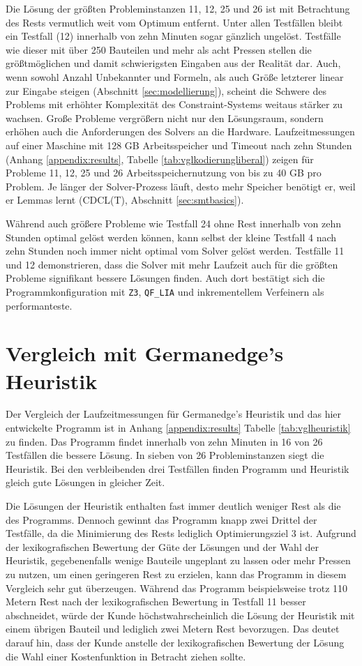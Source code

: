 Die Lösung der größten Probleminstanzen 11, 12, 25 und 26 ist mit Betrachtung des Rests vermutlich weit vom Optimum entfernt.
Unter allen Testfällen bleibt ein Testfall (12) innerhalb von zehn Minuten sogar gänzlich ungelöst.
Testfälle wie dieser mit über 250 Bauteilen und mehr als acht Pressen stellen die größtmöglichen und damit schwierigsten Eingaben aus der Realität dar.
Auch, wenn sowohl Anzahl Unbekannter und Formeln, als auch Größe letzterer linear zur Eingabe steigen (Abschnitt \ref{sec:modellierung}),
scheint die Schwere des Problems mit erhöhter Komplexität des Constraint-Systems weitaus stärker zu wachsen.
Große Probleme vergrößern nicht nur den Lösungsraum, sondern erhöhen auch die Anforderungen des Solvers an die Hardware.
Laufzeitmessungen auf einer Maschine mit 128 GB Arbeitsspeicher und Timeout nach zehn Stunden (Anhang \ref{appendix:results}, Tabelle \ref{tab:vglkodierungliberal}) zeigen für Probleme
11, 12, 25 und 26 Arbeitsspeichernutzung von bis zu 40 GB pro Problem.
Je länger der Solver-Prozess läuft, desto mehr Speicher benötigt er, weil er Lemmas lernt (CDCL(T), Abschnitt \ref{sec:smtbasics}).

Während auch größere Probleme wie Testfall 24 ohne Rest innerhalb von zehn Stunden optimal gelöst werden können, kann selbst der kleine Testfall 4 nach zehn Stunden
noch immer nicht optimal vom Solver gelöst werden.
Testfälle 11 und 12 demonstrieren, dass die Solver mit mehr Laufzeit auch für die größten Probleme signifikant bessere Lösungen finden.
Auch dort bestätigt sich die Programmkonfiguration mit \texttt{Z3}, \texttt{QF\_LIA} und inkrementellem Verfeinern als performanteste.

\section{Vergleich mit Germanedge's Heuristik}
Der Vergleich der Laufzeitmessungen für Germanedge's Heuristik und das hier entwickelte Programm ist in Anhang \ref{appendix:results} Tabelle \ref{tab:vglheuristik} zu finden.
Das Programm findet innerhalb von zehn Minuten in 16 von 26 Testfällen die bessere Lösung.
In sieben von 26 Probleminstanzen siegt die Heuristik.
Bei den verbleibenden drei Testfällen finden Programm und Heuristik gleich gute Lösungen in gleicher Zeit.

Die Lösungen der Heuristik enthalten fast immer deutlich weniger Rest als die des Programms.
Dennoch gewinnt das Programm knapp zwei Drittel der Testfälle, da die Minimierung des Rests lediglich Optimierungsziel 3 ist.
Aufgrund der lexikografischen Bewertung der Güte der Lösungen und der Wahl der Heuristik, gegebenenfalls wenige Bauteile ungeplant zu lassen oder mehr Pressen zu nutzen,
um einen geringeren Rest zu erzielen, kann das Programm in diesem Vergleich sehr gut überzeugen.
Während das Programm beispielsweise trotz 110 Metern Rest nach der lexikografischen Bewertung in Testfall 11 besser abschneidet, würde der Kunde höchstwahrscheinlich die
Lösung der Heuristik mit einem übrigen Bauteil und lediglich zwei Metern Rest bevorzugen.
Das deutet darauf hin, dass der Kunde anstelle der lexikografischen Bewertung der Lösung die Wahl einer Kostenfunktion in Betracht ziehen sollte.

